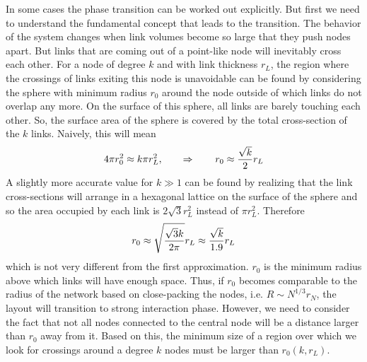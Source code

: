 \documentclass[11pt]{article}
\begin{document}
In some cases the phase transition can be worked out explicitly. 
But first we need to understand the fundamental concept that leads to the transition. 
The behavior of the system changes when link volumes become so large that they push nodes apart. 
But links that are coming out of a point-like node will inevitably cross each other. 
For a node of degree $k$ and with link thickness $r_L$, the region where the crossings of links exiting this node is unavoidable can be found by considering the sphere with minimum radius $r_0$ around the node outside of which links do not overlap any more. 
On the surface of this sphere, all links are barely touching each other. 
So, the surface area of the sphere is covered by the total cross-section of the $k$ links. 
Naively, this will mean 
\[4\pi r_0^2 \approx k \pi r_L^2,\qquad \Rightarrow \qquad r_0 \approx {\sqrt{k}\over 2} r_L  \]
A slightly more accurate value for $k\gg 1$ can be found by realizing that the link cross-sections will arrange in a hexagonal lattice on the surface of the sphere and so the area occupied by each link is $2\sqrt{3} r_L^2$ instead of $\pi r_L^2$. 
Therefore
\[r_0 \approx  \sqrt{{ \sqrt{3} k \over 2\pi }} r_L \approx {\sqrt{k}\over 1.9 } r_L\]
which is not very different from the first approximation. 
$r_0$ is the minimum radius above which links will have enough space. 
Thus, if $r_0$ becomes comparable to the radius of the network based on close-packing the nodes, i.e. $R\sim N^{1/3} r_N$, the layout will transition to strong interaction phase. 
However, we need to consider the fact that not all nodes connected to the central node will be a distance larger than $r_0$ away from it. 
Based on this, the minimum size of a region over which we look for crossings around a degree $k$ nodes must be larger than $r_0(k,r_L)$.
\end{document}
